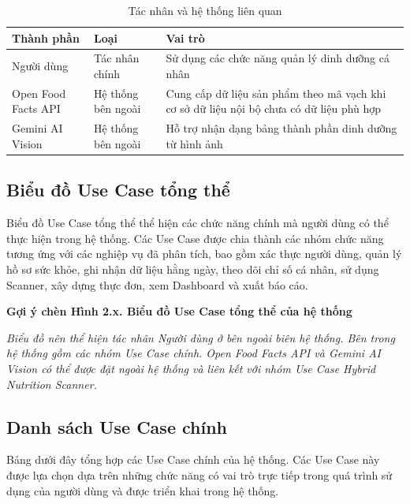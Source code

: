 \documentclass[12pt, a4paper]{report}
\begin{document}
\begin{table}[htbp]
\centering
\caption{Tác nhân và hệ thống liên quan}
\begin{tabular}{|p{4cm}|p{4cm}|p{7cm}|}
\hline
\textbf{Thành phần} & \textbf{Loại} & \textbf{Vai trò} \\
\hline
Người dùng & Tác nhân chính & Sử dụng các chức năng quản lý dinh dưỡng cá nhân \\
\hline
Open Food Facts API & Hệ thống bên ngoài & Cung cấp dữ liệu sản phẩm theo mã vạch khi cơ sở dữ liệu nội bộ chưa có dữ liệu phù hợp \\
\hline
Gemini AI Vision & Hệ thống bên ngoài & Hỗ trợ nhận dạng bảng thành phần dinh dưỡng từ hình ảnh \\
\hline
\end{tabular}
\end{table}
\subsection{Biểu đồ Use Case tổng thể}Biểu đồ Use Case tổng thể thể hiện các chức năng chính mà người dùng có thể thực hiện trong hệ thống. Các Use Case được chia thành các nhóm chức năng tương ứng với các nghiệp vụ đã phân tích, bao gồm xác thực người dùng, quản lý hồ sơ sức khỏe, ghi nhận dữ liệu hằng ngày, theo dõi chỉ số cá nhân, sử dụng Scanner, xây dựng thực đơn, xem Dashboard và xuất báo cáo.

\textbf{Gợi ý chèn Hình 2.x. Biểu đồ Use Case tổng thể của hệ thống}

\textit{Biểu đồ nên thể hiện tác nhân Người dùng ở bên ngoài biên hệ thống. Bên trong hệ thống gồm các nhóm Use Case chính. Open Food Facts API và Gemini AI Vision có thể được đặt ngoài hệ thống và liên kết với nhóm Use Case Hybrid Nutrition Scanner.}

\subsection{Danh sách Use Case chính}Bảng dưới đây tổng hợp các Use Case chính của hệ thống. Các Use Case này được lựa chọn dựa trên những chức năng có vai trò trực tiếp trong quá trình sử dụng của người dùng và được triển khai trong hệ thống.
\end{document}
